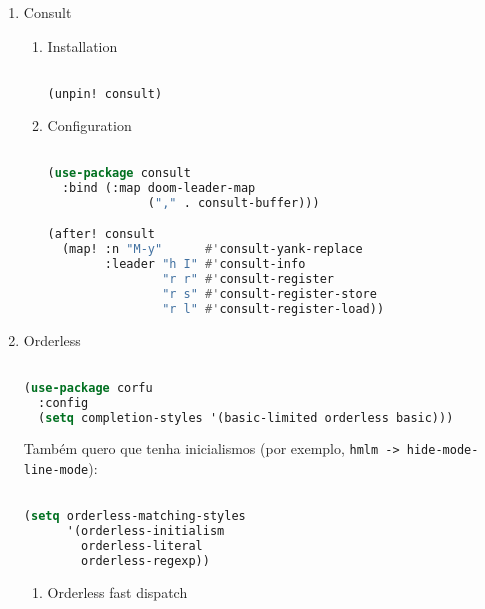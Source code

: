 \documentclass[11pt]{article}
\begin{document}
\begin{enumerate}
  \item Consult
  \label{sec:consult}

  
\begin{enumerate}
  \item Installation
  \label{sec:installation-2}

  \begin{lstlisting}[language=Lisp]%! Someone please complete this list for me

(unpin! consult)
\end{lstlisting}
  \item Configuration
  \label{sec:configuration-2}

  \begin{lstlisting}[language=Lisp]%! Someone please complete this list for me

(use-package consult
  :bind (:map doom-leader-map
              ("," . consult-buffer)))

(after! consult
  (map! :n "M-y"      #'consult-yank-replace 
        :leader "h I" #'consult-info
                "r r" #'consult-register
                "r s" #'consult-register-store
                "r l" #'consult-register-load))
\end{lstlisting}
\end{enumerate}

  \item Orderless
  \label{sec:orderless}

  \begin{lstlisting}[language=Lisp]%! Someone please complete this list for me

(use-package corfu
  :config
  (setq completion-styles '(basic-limited orderless basic)))
\end{lstlisting}

Também quero que tenha inicialismos (por exemplo, \texttt{hmlm -> hide-mode-line-mode}):

\begin{lstlisting}[language=Lisp]%! Someone please complete this list for me

(setq orderless-matching-styles
      '(orderless-initialism
        orderless-literal
        orderless-regexp))
\end{lstlisting}
\begin{enumerate}
  \item Orderless fast dispatch
  \label{sec:orderless-fast-dispatch}

  \begin{lstlisting}[language=Lisp]%! Someone please complete this list for me


\end{lstlisting}
\end{enumerate}
\end{enumerate}
\end{document}

